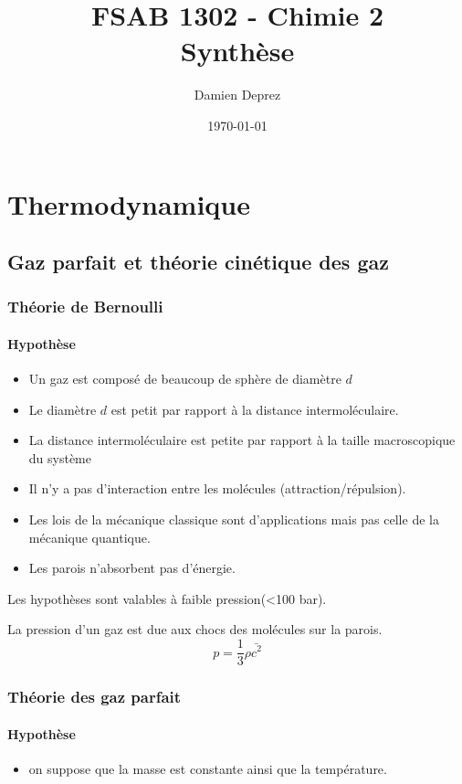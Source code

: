 \documentclass[12pt,a4paper,twoside]{report}
\begin{document}
\makeatletter

\author{Damien Deprez}
\title{FSAB 1302 - Chimie 2\\Synthèse}
\date{\today}
\titre{\@title}{\@author}{\@date}{}{}

\tableofcontents
\part{Thermodynamique}
\chapter{Gaz parfait et théorie cinétique des gaz}
\section{Théorie de Bernoulli}
\subsection{Hypothèse}
\begin{itemize}
\item Un gaz est composé de beaucoup de sphère de diamètre $d$
\item Le diamètre $d$ est petit par rapport à la distance intermoléculaire.
\item La distance intermoléculaire est petite par rapport à la taille macroscopique du système
\item Il n'y a pas d'interaction entre les molécules (attraction/répulsion).
\item Les lois de la mécanique classique sont d'applications mais pas celle de la mécanique quantique.
\item Les parois n'absorbent pas d'énergie.
\end{itemize}
Les hypothèses sont valables à faible pression(<100 bar).

La pression d'un gaz est due aux chocs des molécules sur la parois.
$$ p =\frac{1}{3} \rho\bar{c^2}$$
\section{Théorie des gaz parfait}
\subsection{Hypothèse}
\begin{itemize}
\item on suppose que la masse est constante ainsi que la température.
\end{itemize}
\end{document}
